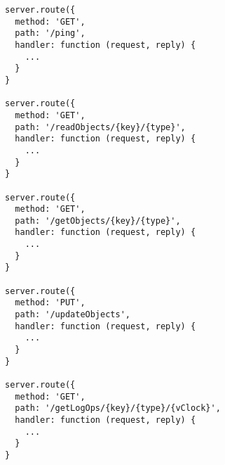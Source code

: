 \begin{lstlisting}[caption={Integration proxy API},label={lst:proxy_api}]
server.route({
  method: 'GET',
  path: '/ping',
  handler: function (request, reply) {
    ...
  }
}

server.route({
  method: 'GET',
  path: '/readObjects/{key}/{type}',
  handler: function (request, reply) {
    ...
  }
}

server.route({
  method: 'GET',
  path: '/getObjects/{key}/{type}',
  handler: function (request, reply) {
    ...
  }
}

server.route({
  method: 'PUT',
  path: '/updateObjects',
  handler: function (request, reply) {
    ...
  }
}

server.route({
  method: 'GET',
  path: '/getLogOps/{key}/{type}/{vClock}',
  handler: function (request, reply) {
    ...
  }
}
\end{lstlisting}




